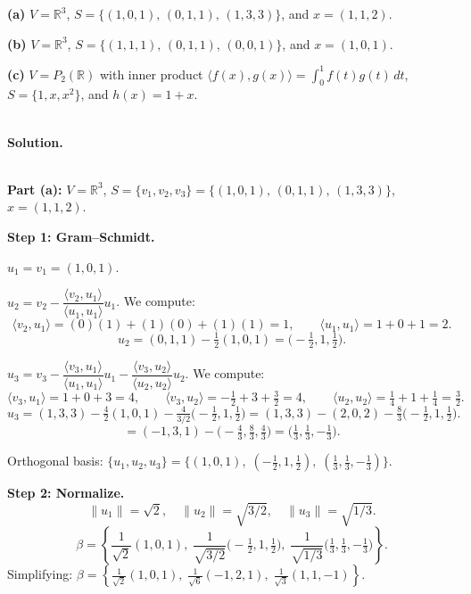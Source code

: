 \documentclass{article}
\begin{document}
\medskip

\textbf{(a)} $V = \mathbb{R}^3$, $S = \{(1,0,1),\,(0,1,1),\,(1,3,3)\}$, and $x = (1,1,2)$.

\textbf{(b)} $V = \mathbb{R}^3$, $S = \{(1,1,1),\,(0,1,1),\,(0,0,1)\}$, and $x = (1,0,1)$.

\textbf{(c)} $V = P_2(\mathbb{R})$ with inner product $\langle f(x), g(x) \rangle = \int_0^1 f(t)g(t)\,dt$, $S = \{1, x, x^2\}$, and $h(x) = 1 + x$.

\noindent\\
\textbf{Solution.}\\
\quad\\
\begin{mdframed}[linewidth=1pt]

\textbf{Part (a):} $V = \mathbb{R}^3$, $S = \{v_1, v_2, v_3\} = \{(1,0,1),\,(0,1,1),\,(1,3,3)\}$, $x = (1,1,2)$.

\textbf{Step 1: Gram--Schmidt.}

$u_1 = v_1 = (1,0,1)$.

$u_2 = v_2 - \dfrac{\langle v_2, u_1 \rangle}{\langle u_1, u_1 \rangle} u_1$. We compute:
\[
\langle v_2, u_1 \rangle = (0)(1)+(1)(0)+(1)(1) = 1, \qquad \langle u_1, u_1 \rangle = 1+0+1 = 2.
\]
\[
u_2 = (0,1,1) - \tfrac{1}{2}(1,0,1) = \bigl(-\tfrac{1}{2}, 1, \tfrac{1}{2}\bigr).
\]

$u_3 = v_3 - \dfrac{\langle v_3, u_1 \rangle}{\langle u_1, u_1 \rangle} u_1 - \dfrac{\langle v_3, u_2 \rangle}{\langle u_2, u_2 \rangle} u_2$. We compute:
\[
\langle v_3, u_1 \rangle = 1+0+3 = 4, \qquad \langle v_3, u_2 \rangle = -\tfrac{1}{2}+3+\tfrac{3}{2} = 4, \qquad \langle u_2, u_2 \rangle = \tfrac{1}{4}+1+\tfrac{1}{4} = \tfrac{3}{2}.
\]
\[
u_3 = (1,3,3) - \tfrac{4}{2}(1,0,1) - \tfrac{4}{3/2}\bigl(-\tfrac{1}{2},1,\tfrac{1}{2}\bigr) = (1,3,3) - (2,0,2) - \tfrac{8}{3}\bigl(-\tfrac{1}{2},1,\tfrac{1}{2}\bigr).
\]
\[
= (-1,3,1) - \bigl(-\tfrac{4}{3}, \tfrac{8}{3}, \tfrac{4}{3}\bigr) = \bigl(\tfrac{1}{3}, \tfrac{1}{3}, -\tfrac{1}{3}\bigr).
\]

Orthogonal basis: $\{u_1, u_2, u_3\} = \{(1,0,1),\; (-\tfrac{1}{2},1,\tfrac{1}{2}),\; (\tfrac{1}{3},\tfrac{1}{3},-\tfrac{1}{3})\}$.

\textbf{Step 2: Normalize.}
\[
\|u_1\| = \sqrt{2}, \quad \|u_2\| = \sqrt{3/2}, \quad \|u_3\| = \sqrt{1/3}.
\]
\[
\beta = \left\{ \frac{1}{\sqrt{2}}(1,0,1),\; \frac{1}{\sqrt{3/2}}\bigl(-\tfrac{1}{2},1,\tfrac{1}{2}\bigr),\; \frac{1}{\sqrt{1/3}}\bigl(\tfrac{1}{3},\tfrac{1}{3},-\tfrac{1}{3}\bigr) \right\}.
\]
Simplifying: $\beta = \left\{ \frac{1}{\sqrt{2}}(1,0,1),\; \frac{1}{\sqrt{6}}(-1,2,1),\; \frac{1}{\sqrt{3}}(1,1,-1) \right\}$.


\end{mdframed}
\end{document}
